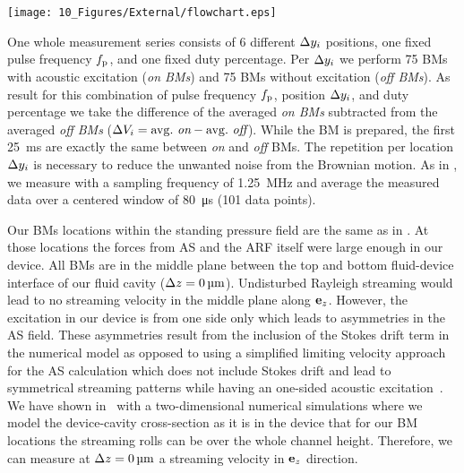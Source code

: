 \begin{figure*}[tbp]
  \centering
  \texttt{[image: 10\_Figures/External/flowchart.eps]}
  \caption{Process diagram for one measurement cycle. The gray rectangles 
    represent the processes during the build up measurement (BM). During this 
    time the particle is free floating (orange area). All process steps others 
    are before or after a BM. The timestamps in the hatched rounded 
    rectangles represent the times when the process attached to them is 
    executed. One measurement cycle takes about \SI{2}{\s} to be executed. The 
  BM itself is less than \SI{100}{\ms}.}\label{fig:flowchart}
\end{figure*}

One whole measurement series consists of 6 different $\Delta y_{i}$ positions, one 
fixed pulse frequency $f_{\mathrm{p}}$, and one fixed duty percentage. Per $\Delta y_{i}$ we 
perform 75 BMs with acoustic excitation (\emph{on BMs}) and 75 BMs without 
excitation (\emph{off BMs}). As result for this combination of pulse frequency 
$f_{\mathrm{p}}$, position $\Delta y_{i}$, and duty percentage we take the difference of the 
averaged \emph{on BMs} subtracted from the averaged \emph{off BMs} ($\Delta V_{i}= 
{\mathrm{avg.~\emph{on}}} - {\mathrm{avg.~\emph{off}}}$). While the BM is 
prepared, the first \SI{25}{\ms} are exactly the same between \emph{on} and 
\emph{off} BMs. The repetition per location $\Delta y_{i}$ is necessary to reduce 
the unwanted noise from the Brownian motion. As in \cite{Goering2021}, we 
measure with a sampling frequency of \SI{1.25}{\mega\hertz} and average the 
measured data over a centered window of \SI{80}{\us} (101 data points).

Our BMs locations within the standing pressure field are the same as in 
\cite{Goering2021}. At those locations the forces from AS and the ARF itself 
were large enough in our device. All BMs are in the middle plane between the 
top and bottom fluid-device interface of our fluid cavity ($\Delta z = 
\SI{0}{\si{\micro\meter}}$). Undisturbed Rayleigh streaming would lead to no streaming 
velocity in the middle plane along $\vb{e}_{z}$. However, the excitation in our device 
is from one side only which leads to asymmetries in the AS field. These 
asymmetries result from the inclusion of the Stokes drift term in the numerical 
model as opposed to using a simplified limiting velocity approach for the AS 
calculation which does not include Stokes drift and lead to symmetrical 
streaming patterns while having an one-sided acoustic 
excitation~\cite{Hahn2016}. We have shown in~\cite{Goering2021} with a 
two-dimensional numerical simulations where we model the device-cavity 
cross-section as it is in the device that for our BM locations the streaming 
rolls can be over the whole channel height. Therefore, we can measure at $\Delta z 
= \SI{0}{\si{\micro\meter}}$ a streaming velocity in $\vb{e}_{z}$ direction.


